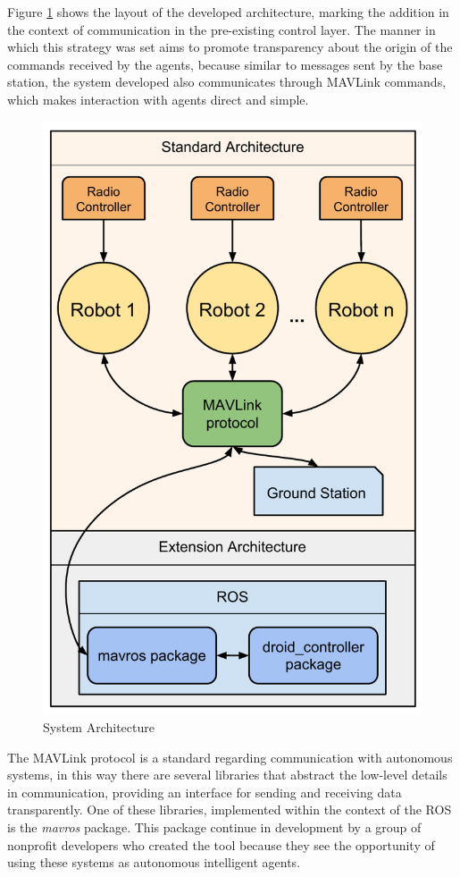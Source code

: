 Figure \ref{fig:architecture} shows the layout of the developed architecture, marking the addition in the context of communication in the pre-existing control layer.
The manner in which this strategy was set aims to promote transparency about the origin of the commands received by the agents, because similar to messages sent by the base station, the system developed also communicates through MAVLink commands, which makes interaction with agents direct and simple.

\begin{figure}
  \centering
  \includegraphics[width=0.8\columnwidth]{img/arquitetura.pdf}
  \caption{System Architecture}
  \label{fig:architecture}
\end{figure}

The MAVLink protocol is a standard regarding communication with autonomous systems, in this way there are several libraries that abstract the low-level details in communication, providing an interface for sending and receiving data transparently.
One of these libraries, implemented within the context of the ROS is the \emph{mavros} package.
This package continue in development by a group of nonprofit developers who created the tool because they see the opportunity of using these systems as autonomous intelligent agents.

